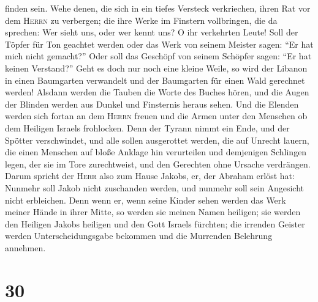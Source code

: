 finden sein.  Wehe denen, die sich in ein tiefes Versteck
verkriechen, ihren Rat vor dem \textsc{Herrn} zu verbergen; die ihre
Werke im Finstern vollbringen, die da sprechen: Wer sieht uns, oder wer
kennt uns?  O ihr verkehrten Leute! Soll der Töpfer für
Ton geachtet werden oder das Werk von seinem Meister sagen: ``Er hat
mich nicht gemacht?'' Oder soll das Geschöpf von seinem Schöpfer sagen:
``Er hat keinen Verstand?''  Geht es doch nur noch eine
kleine Weile, so wird der Libanon in einen Baumgarten verwandelt und der
Baumgarten für einen Wald gerechnet werden!  Alsdann
werden die Tauben die Worte des Buches hören, und die Augen der Blinden
werden aus Dunkel und Finsternis heraus sehen.  Und die
Elenden werden sich fortan an dem \textsc{Herrn} freuen und die Armen
unter den Menschen ob dem Heiligen Israels frohlocken. 
Denn der Tyrann nimmt ein Ende, und der Spötter verschwindet, und alle
sollen ausgerottet werden, die auf Unrecht lauern,  die
einen Menschen auf bloße Anklage hin verurteilen und demjenigen
Schlingen legen, der sie im Tore zurechtweist, und den Gerechten ohne
Ursache verdrängen.  Darum spricht der \textsc{Herr} also
zum Hause Jakobs, er, der Abraham erlöst hat: Nunmehr soll Jakob nicht
zuschanden werden, und nunmehr soll sein Angesicht nicht erbleichen.
 Denn wenn er, wenn seine Kinder sehen werden das Werk
meiner Hände in ihrer Mitte, so werden sie meinen Namen heiligen; sie
werden den Heiligen Jakobs heiligen und den Gott Israels fürchten;
 die irrenden Geister werden Unterscheidungsgabe bekommen
und die Murrenden Belehrung annehmen.

\hypertarget{section-29}{%
\section{30}\label{section-29}}

